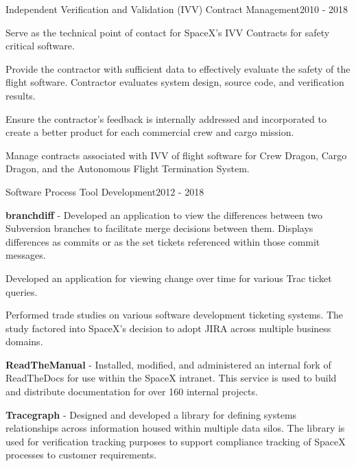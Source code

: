 \begin{cventries}

  \cventry
  {Independent Verification and Validation (IVV) Contract Management}{}{}{2010 - 2018}
  {
    \begin{cvitems}
    \item Serve as the technical point of contact for SpaceX's IVV Contracts for
      safety critical software.
    \item Provide the contractor with sufficient data to effectively
      evaluate the safety of the flight software. Contractor evaluates
      system design, source code, and verification results.
    \item Ensure the contractor's feedback is internally addressed and
      incorporated to create a better product for each commercial crew and
      cargo mission.
    \item Manage contracts associated with IVV of flight software for Crew
      Dragon, Cargo Dragon, and the Autonomous Flight Termination
      System.
    \end{cvitems}
  }


  \cventry
  {Software Process Tool Development}{}{}{2012 - 2018}
  {
    \begin{cvitems}
    \item \textbf{branchdiff} - Developed an application to view the differences
      between two Subversion branches to facilitate merge decisions
      between them. Displays differences as commits or as the set tickets
      referenced within those commit messages.
    \item Developed an application for viewing change over time for various Trac
      ticket queries.
    \item Performed trade studies on various software development
      ticketing systems. The study factored into SpaceX's decision to
      adopt JIRA across multiple business domains.
    \item \textbf{ReadTheManual} - Installed, modified, and administered an
      internal fork of ReadTheDocs for use within the SpaceX
      intranet. This service is used to build and distribute documentation
      for over 160 internal projects.
    \item \textbf{Tracegraph} - Designed and developed a library for
      defining systems relationships across information housed within
      multiple data silos. The library is used for verification tracking
      purposes to support compliance tracking of SpaceX processes to
      customer requirements.
    \end{cvitems}
  }


\end{cventries}
